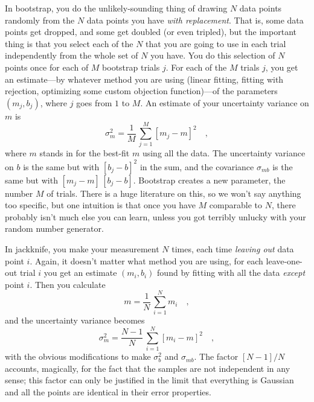 \documentclass[12pt,twoside]{article}
\begin{document}
In bootstrap, you do the unlikely-sounding thing of drawing $N$ data
points randomly from the $N$ data points you have \emph{with
  replacement}.  That is, some data points get dropped, and some get
doubled (or even tripled), but the important thing is that you select
each of the $N$ that you are going to use in each trial independently
from the whole set of $N$ you have.  You do this selection of $N$
points once for each of $M$ bootstrap trials $j$.  For each of the $M$
trials $j$, you get an estimate---by whatever method you are using
(linear fitting, fitting with rejection, optimizing some custom
objection function)---of the parameters $(m_j,b_j)$, where $j$ goes
from $1$ to $M$.  An estimate of your uncertainty variance on $m$ is
\begin{equation}
\sigma_m^2 = \frac{1}{M}\,\sum_{j=1}^M [m_j-m]^2 \quad ,
\end{equation}
where $m$ stands in for the best-fit $m$ using all the data.  The
uncertainty variance on $b$ is the same but with $[b_j-b]^2$ in the
sum, and the covariance $\sigma_{mb}$ is the same but with
$[m_j-m]\,[b_j-b]$.  Bootstrap creates a new parameter, the number $M$
of trials.  There is a huge literature on this, so we won't say
anything too specific, but one intuition is that once you have $M$
comparable to $N$, there probably isn't much else you can learn,
unless you got terribly unlucky with your random number generator.

In jackknife, you make your measurement $N$ times, each time
\emph{leaving out} data point $i$.  Again, it doesn't matter what
method you are using, for each leave-one-out trial $i$ you get an
estimate $(m_i,b_i)$ found by fitting with all the data \emph{except}
point $i$.  Then you calculate
\begin{equation}
m = \frac{1}{N}\,\sum_{i=1}^N m_i \quad ,
\end{equation}
and the uncertainty variance becomes
\begin{equation}
\sigma_m^2 = \frac{N-1}{N}\,\sum_{i=1}^N [m_i-m]^2 \quad ,
\end{equation}
with the obvious modifications to make $\sigma_b^2$ and $\sigma_{mb}$.
The factor $[N-1]/N$ accounts, magically, for the fact that the
samples are not independent in any sense; this factor can only be
justified in the limit that everything is Gaussian and all the points
are identical in their error properties.
\end{document}
